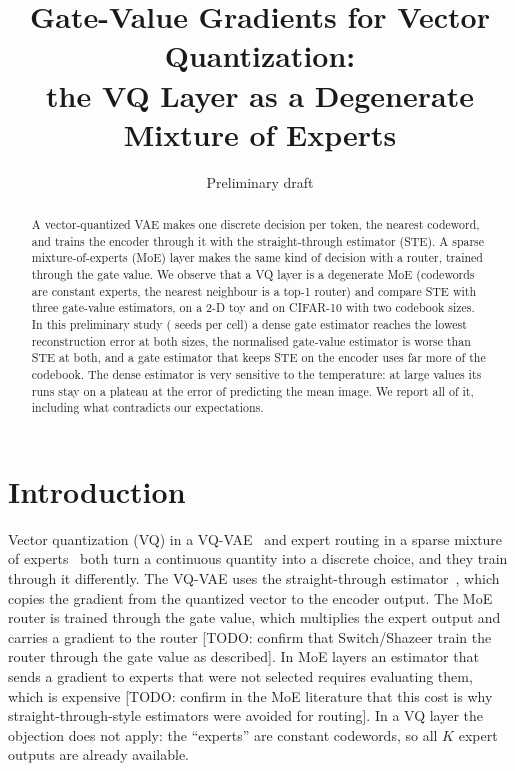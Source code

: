 \documentclass[11pt]{article}
\title{Gate-Value Gradients for Vector Quantization:\\
       the VQ Layer as a Degenerate Mixture of Experts}
\author{\todo{authors}}
\date{Preliminary draft}
\newcommand{\todo}[1]{{\color{red}[TODO: #1]}}
\begin{document}
\maketitle

\begin{abstract}
A vector-quantized VAE makes one discrete decision per token, the nearest codeword, and trains the
encoder through it with the straight-through estimator (STE). A sparse mixture-of-experts (MoE)
layer makes the same kind of decision with a router, trained through the gate value. We observe
that a VQ layer is a degenerate MoE (codewords are constant experts, the nearest neighbour is a
top-1 router) and compare STE with three gate-value estimators, on a 2-D toy and on CIFAR-10 with
two codebook sizes. In this preliminary study (\resNSeeds{} seeds per cell) a dense gate estimator
reaches the lowest reconstruction error at both sizes, the normalised gate-value estimator is worse
than STE at both, and a gate estimator that keeps STE on the encoder uses far more of the codebook. The
dense estimator is very sensitive to the temperature: at large values its runs stay on a plateau at
the error of predicting the mean image. We report all of it, including what contradicts our
expectations.
\end{abstract}

\section{Introduction}
Vector quantization (VQ) in a VQ-VAE~\cite{vandenoord2017vqvae} and expert routing in a sparse
mixture of experts~\cite{shazeer2017moe,fedus2021switch} both turn a continuous quantity into a
discrete choice, and they train through it differently. The VQ-VAE uses the straight-through
estimator~\cite{bengio2013ste}, which copies the gradient from the quantized vector to the encoder
output. The MoE router is trained through the gate value, which multiplies the expert output and
carries a gradient to the router \todo{confirm that Switch/Shazeer train the router through the
gate value as described}. In MoE layers an estimator that sends a gradient to experts that were not
selected requires evaluating them, which is expensive \todo{confirm in the MoE literature that this
cost is why straight-through-style estimators were avoided for routing}. In a VQ layer the
objection does not apply: the ``experts'' are constant codewords, so all $K$ expert outputs are
already available.
\end{document}
